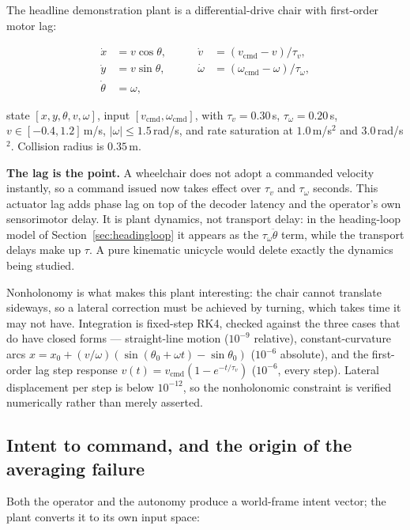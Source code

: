 \documentclass[11pt,a4paper]{article}
\theoremstyle{plain}
\theoremstyle{definition}
\begin{document}
The headline demonstration plant is a differential-drive chair with
first-order motor lag:

\begin{equation}
\begin{aligned}
\dot x &= v\cos\theta, &\qquad \dot v &= (v_{\mathrm{cmd}} - v)/\tau_v, \\
\dot y &= v\sin\theta, &\qquad \dot\omega &= (\omega_{\mathrm{cmd}} - \omega)/\tau_\omega, \\
\dot\theta &= \omega, & &
\end{aligned}
\label{eq:uni}
\end{equation}

state $[x, y, \theta, v, \omega]$, input $[v_{\mathrm{cmd}},
\omega_{\mathrm{cmd}}]$, with $\tau_v = 0.30$\,s,
$\tau_\omega = 0.20$\,s, $v \in [-0.4, 1.2]$\,m/s,
$|\omega| \le 1.5$\,rad/s, and rate saturation at $1.0$\,m/s$^2$ and
$3.0$\,rad/s$^2$. Collision radius is $0.35$\,m.

\textbf{The lag is the point.} A wheelchair does not adopt a commanded
velocity instantly, so a command issued now takes effect over $\tau_v$
and $\tau_\omega$ seconds. This actuator lag adds phase lag on top of the
decoder latency and the operator's own sensorimotor delay. It is plant
dynamics, not transport delay: in the heading-loop model of
Section~\ref{sec:headingloop} it appears as the $\tau_\omega\ddot\theta$
term, while the transport delays make up $\tau$. A pure kinematic unicycle
would delete exactly the dynamics being studied.

Nonholonomy is what makes this plant interesting: the chair cannot
translate sideways, so a lateral correction must be achieved by turning,
which takes time it may not have. Integration is fixed-step RK4, checked
against the three cases that do have closed forms --- straight-line
motion ($10^{-9}$ relative), constant-curvature arcs
$x = x_0 + (v/\omega)(\sin(\theta_0 + \omega t) - \sin\theta_0)$
($10^{-6}$ absolute), and the first-order lag step response
$v(t) = v_{\mathrm{cmd}}(1 - e^{-t/\tau_v})$ ($10^{-6}$, every step).
Lateral displacement per step is below $10^{-12}$, so the nonholonomic
constraint is verified numerically rather than merely asserted.

\subsection{Intent to command, and the origin of the averaging failure}
\label{sec:intent}

Both the operator and the autonomy produce a world-frame intent vector;
the plant converts it to its own input space:
\end{document}
